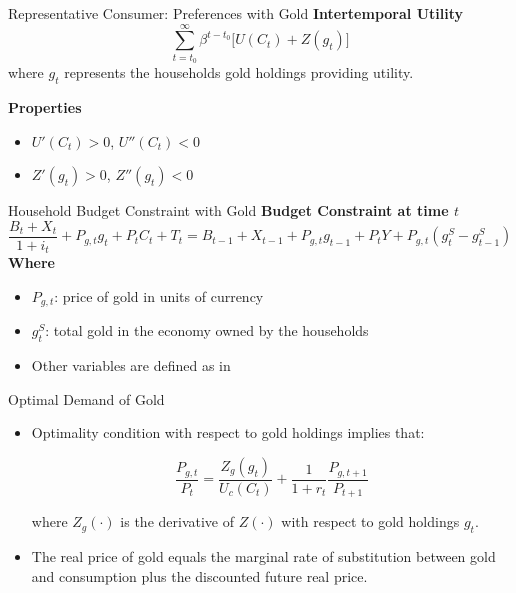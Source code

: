 \documentclass[11pt,aspectratio=169]{beamer}
\begin{document}
\begin{frame}{Representative Consumer: Preferences with Gold}
\textbf{Intertemporal Utility}
\begin{equation}
\sum_{t=t_0}^{\infty} \beta^{t-t_0} \big[ U(C_t) + Z(g_t) \big]
\label{eq: utility_gold}
\end{equation}
where $g_t$ represents the households gold holdings providing utility.

\vspace{0.3cm}
\textbf{Properties}
\begin{itemize}
  \item $U'(C_t) > 0$, $U''(C_t) < 0$ 
  \item $Z'(g_t) > 0$, $Z''(g_t) < 0$
\end{itemize}
\end{frame}

\begin{frame}{Household Budget Constraint with Gold}
\textbf{Budget Constraint at time $t$}
\begin{equation} \label{eq: budget_gold}
\frac{B_t + X_t}{1+i_t} + P_{g,t} g_t + P_t C_t + T_t
= B_{t-1} + X_{t-1} + P_{g,t} g_{t-1} + P_t Y + P_{g,t} (g_t^S - g_{t-1}^S)
\end{equation}
\vspace{0.2cm}
\textbf{Where}
\begin{itemize}
  \item $P_{g,t}$: price of gold in units of currency
  \item $g_t^S$: total gold in the economy owned by the households
  \item Other variables are defined as in \hyperlink{orig_budget}{}
\end{itemize}
\end{frame}

\begin{frame}{Optimal Demand of Gold}
\begin{itemize}
  \item Optimality condition with respect to gold holdings implies that:

\begin{equation} \label{eq: FOC_gold}
\frac{P_{g,t}}{P_t} = \frac{Z_g(g_t)}{U_c(C_t)} + \frac{1}{1+r_t} \frac{P_{g,t+1}}{P_{t+1}}
\end{equation}

where $Z_g(\cdot)$ is the derivative of $Z(\cdot)$ with respect to gold holdings $g_t$.
\vspace{0.3cm}
  \item The real price of gold equals the marginal rate of substitution between gold and consumption plus the discounted future real price.
\end{itemize}
\end{frame}
\end{document}
